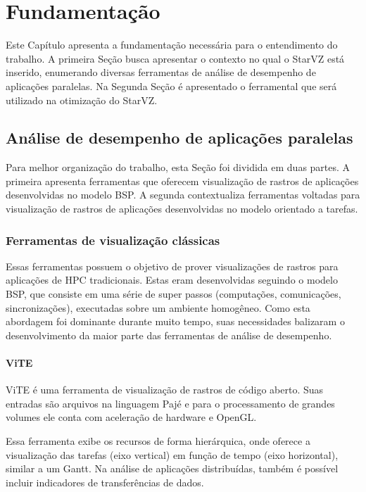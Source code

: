 
\chapter{Fundamentação} \label{ch:fundamentation}

Este Capítulo apresenta a fundamentação necessária para o entendimento do 
trabalho. A primeira Seção busca apresentar o contexto no qual o StarVZ está 
inserido, enumerando diversas ferramentas de análise de desempenho de aplicações 
paralelas. Na Segunda Seção é apresentado o ferramental que será utilizado na 
otimização do StarVZ.


\section{Análise de desempenho de aplicações paralelas}

Para melhor organização do trabalho, esta Seção foi dividida em duas partes. A 
primeira apresenta ferramentas que oferecem visualização de rastros de 
aplicações desenvolvidas no modelo BSP. A segunda contextualiza ferramentas 
voltadas para visualização de rastros de aplicações desenvolvidas no modelo 
orientado a tarefas.

\subsection{Ferramentas de visualização clássicas}

Essas ferramentas possuem o objetivo de prover visualizações de rastros para 
aplicações de HPC tradicionais. Estas eram desenvolvidas seguindo o modelo 
BSP, que consiste em uma série de super passos (computações, comunicações, 
sincronizações), executadas sobre um ambiente homogêneo. Como esta abordagem  
foi dominante durante muito tempo, suas necessidades balizaram 
o desenvolvimento da maior parte das ferramentas de análise de desempenho.

\subsubsection*{ViTE}
ViTE \cite{ref:vite} é uma ferramenta de visualização de rastros de código 
aberto. Suas entradas são arquivos na linguagem Pajé \cite{ref:paje} e para o 
processamento de grandes volumes ele conta com aceleração de hardware e 
OpenGL. 

Essa ferramenta exibe os recursos de forma hierárquica, onde oferece a 
visualização das tarefas (eixo vertical) em função de tempo (eixo horizontal), 
similar a um Gantt. Na análise de aplicações distribuídas, também é possível 
incluir indicadores de transferências de dados.

